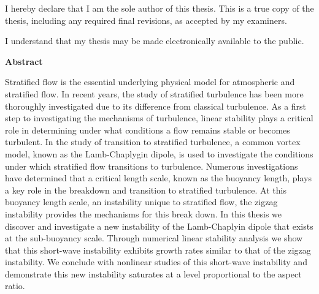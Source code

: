 \cleardoublepage %
 


  \noindent
I hereby declare that I am the sole author of this thesis. This is a true copy of the thesis, including any required final revisions, as accepted by my examiners.

  \bigskip
  
  \noindent
I understand that my thesis may be made electronically available to the public.

\cleardoublepage


\begin{center}\textbf{Abstract}\end{center}
Stratified flow is the essential underlying physical model for atmospheric and stratified flow. In recent years, the study of stratified turbulence has been more thoroughly investigated due to its difference from classical turbulence. As a first step to investigating the mechanisms of turbulence, linear stability plays a critical role in determining under what conditions a flow remains stable or becomes turbulent. In the study of transition to stratified turbulence, a common vortex model, known as the Lamb-Chaplygin dipole, is used to investigate the conditions under which stratified flow transitions to turbulence. Numerous investigations have determined that a critical length scale, known as the buoyancy length, plays a key role in the breakdown and transition to stratified turbulence. At this buoyancy length scale, an instability unique to stratified flow, the zigzag instability provides the mechanisms for this break down.  In this thesis we discover and investigate a new instability of the Lamb-Chaplyin dipole that exists at the sub-buoyancy scale. Through numerical linear stability analysis we show that this short-wave instability exhibits growth rates similar to that of the zigzag instability. We conclude with nonlinear studies of this short-wave instability and demonstrate this new instability saturates at a level proportional to the aspect ratio. 
\cleardoublepage

